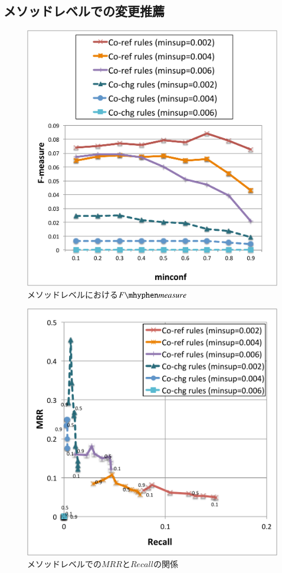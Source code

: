 \documentclass[a4paper]{jsbook}
\newcommand{\fmeasure}{F\mhyphen measure}
\begin{document}
\subsection{メソッドレベルでの変更推薦}\label{method_result_sec}

\begin{figure}[p]
  \centering
  \includegraphics[width = 0.95\linewidth]{resource/fmeasure_m.pdf}
  \caption{メソッドレベルにおける$\fmeasure$}
  \label{m_fmeasure}
\end{figure}
\begin{figure}[p]
  \centering
  \includegraphics[width = 0.95\linewidth]{resource/mrgraph_m.pdf}
  \caption{メソッドレベルでの$MRR$と$Recall$の関係}
  \label{m_mrgraph}
\end{figure}
\end{document}
